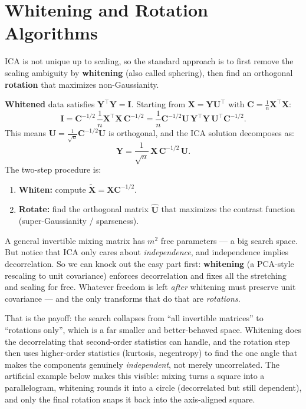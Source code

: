 \documentclass[11pt, oneside]{book}
\newcommand{\T}{^{\top}}
\begin{document}
\section{Whitening and Rotation Algorithms}

ICA is not unique up to scaling, so the standard approach is to first remove the
scaling ambiguity by \textbf{whitening} (also called sphering), then find an
orthogonal \textbf{rotation} that maximizes non-Gaussianity.

\textbf{Whitened} data satisfies $\bm{Y}\T\bm{Y} = \bm{I}$.
Starting from $\bm{X} = \bm{Y}\bm{U}\T$ with $\bm{C} = \frac{1}{n}\bm{X}\T\bm{X}$:
\[
  \bm{I} = \bm{C}^{-1/2}\,\frac{1}{n}\bm{X}\T\bm{X}\,\bm{C}^{-1/2}
  = \frac{1}{n}\bm{C}^{-1/2}\bm{U}\,\bm{Y}\T\bm{Y}\,\bm{U}\T\bm{C}^{-1/2}.
\]
This means $\hat{\bm{U}} = \frac{1}{\sqrt{n}}\bm{C}^{-1/2}\bm{U}$ is orthogonal, and
the ICA solution decomposes as:
\[
  \bm{Y} = \frac{1}{\sqrt{n}}\,\bm{X}\,\bm{C}^{-1/2}\,\hat{\bm{U}}.
\]
The two-step procedure is:
\begin{enumerate}
  \item \textbf{Whiten:} compute $\tilde{\bm{X}} = \bm{X}\bm{C}^{-1/2}$.
  \item \textbf{Rotate:} find the orthogonal matrix $\hat{\bm{U}}$ that maximizes
        the contrast function (super-Gaussianity / sparseness).
\end{enumerate}

\begin{intbox}[title={Why split the search into whitening and rotation?}]
A general invertible mixing matrix has $m^2$ free parameters --- a big search
space.
But notice that ICA only cares about \emph{independence}, and independence
implies decorrelation.
So we can knock out the easy part first: \textbf{whitening} (a PCA-style
rescaling to unit covariance) enforces decorrelation and fixes all the stretching
and scaling for free.
Whatever freedom is left \emph{after} whitening must preserve unit covariance ---
and the only transforms that do that are \emph{rotations}.

That is the payoff: the search collapses from ``all invertible matrices'' to
``rotations only'', which is a far smaller and better-behaved space.
Whitening does the decorrelating that second-order statistics can handle, and the
rotation step then uses higher-order statistics (kurtosis, negentropy) to find
the one angle that makes the components genuinely \emph{independent}, not merely
uncorrelated.
The artificial example below makes this visible: mixing turns a square into a
parallelogram, whitening rounds it into a circle (decorrelated but still
dependent), and only the final rotation snaps it back into the axis-aligned
square.
\end{intbox}
\end{document}
